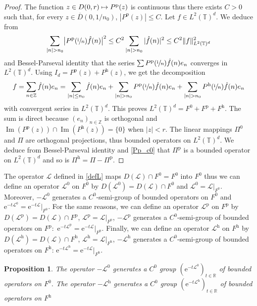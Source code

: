 \documentclass[10pt]{amsart}
\let\mathcal\mathscr
\def\mto{\mathchoice{\longmapsto}{\mapsto}{\mapsto}{\mapsto}}
\theoremstyle{plain}
\newtheorem{prop}[theorem]{Proposition}
\theoremstyle{definition}
\theoremstyle{remark}
\DeclareMathOperator{\Ima}{Im}
\newcommand{\set}{\mathbb}
\newcommand{\Z}{\set{Z}}
\newcommand{\R}{} %
\renewcommand{\R}{\set{R}}
\newcommand{\T}{\set{T}}
\newcommand{\h}{{\mathrm h}}
\newcommand{\p}{{\mathrm p}}
\newcommand{\eu}{\mathrm e}
\newcommand{\iu}{\mathrm i}
\let\originalleft\left
\let\originalright\right
\renewcommand{\left}{\mathopen{}\mathclose\bgroup\originalleft}
\renewcommand{\right}{\aftergroup\egroup\originalright}
\begin{document}
\begin{proof}
The function $z \in D(0,r) \mto P^\p(z)$ is continuous thus there exists $C>0$ such that, for every $z \in \overline{D}(0,1/n_0)$, $|P^\p(z)|\leq C$. Let $f \in L^2(\T)^d$. We deduce from
\begin{equation} \label{Pp_c0}
\sum_{|n| > n_0} \bigl| P^\p\left(\sfrac{\iu}{n}\right) \hat{f}(n) \bigr|^2 \leq C^2
\sum_{|n| > n_0} |\hat{f}(n)|^2 \leq C^2 \|f\|_{L^2(\T)^d}^2
\end{equation}
and Bessel-Parseval identity that the series $\sum P^\p\left(\sfrac{\iu}{n}\right) \hat{f}(n) e_n$ converges in $L^2(\T)^d$.
Using $I_d=P^\p(z)+P^\h(z)$, we get the decomposition
\[
f = \sum_{n\in\Z} \hat{f}(n) e_n =
\sum_{|n|\leq n_0} \hat{f}(n) e_n +
\sum_{|n| > n_0} P^\p\left(\sfrac{\iu}{n}\right) \hat{f}(n) e_n +
\sum_{|n| > n_0} P^\h\left(\sfrac{\iu}{n}\right) \hat{f}(n) e_n
\]
with convergent series in $L^2(\T)^d$.
This proves $L^2(\T)^{d} = F^0 + F^\p + F^\h$. The sum is direct because $(e_n)_{n\in\Z}$ is orthogonal and $\Ima(P^\p(z))\cap\Ima(P^\h(z))=\{0\}$ when $|z|<r$.
The linear mappings $\Pi^0$ and $\Pi$ are orthogonal projections, thus bounded operators on $L^2(\T)^d$. We deduce from Bessel-Parseval identity and \eqref{Pp_c0} that
$\Pi^\p$ is a bounded operator on $L^2(\T)^d$ and so is $\Pi^\h=\Pi-\Pi^\p$.
\end{proof}

The operator $\mathcal{L}$ defined in \eqref{defL} maps $D(\mathcal{L})\cap F^0 = F^0$ into $F^0$ thus we can define an operator $\mathcal{L}^0$ on $F^0$ by
$D(\mathcal{L}^0)=D(\mathcal{L})\cap F^0$ and $\mathcal{L}^0=\mathcal{L}|_{F^0}$. Moreover, $-\mathcal{L}^0$ generates a $C^0$-semi-group of bounded operators on $F^0$ and $\eu^{-t\mathcal{L}^0}=\eu^{-t\mathcal{L}}|_{F^0}$.
For the same reasons, we can define an operator $\mathcal{L}^\p$ on $F^\p$ by $D(\mathcal{L}^\p)=D(\mathcal{L})\cap F^\p$, $\mathcal{L}^\p=\mathcal{L}|_{F^\p}$, $-\mathcal{L}^\p$ generates a $C^0$-semi-group of bounded operators on \hbox{$F^\p$: $\eu^{-t\mathcal{L}^\p}=\eu^{-t\mathcal{L}}|_{F^\p}$}.
Finally, we can define an operator $\mathcal{L}^\h$ on $F^\h$ by $D(\mathcal{L}^\h)=D(\mathcal{L})\cap F^\h$, $\mathcal{L}^\h=\mathcal{L}|_{F^\h}$, $-\mathcal{L}^\h$ generates a $C^0$-semi-group of bounded operators on $F^\h$: $\eu^{-t\mathcal{L}^\h}=\eu^{-t\mathcal{L}}|_{F^\h}$.

\begin{prop}\label{ExtendSemigroups}
The operator $-\mathcal{L}^0$ generates a $C^0$ group $(\eu^{-t\mathcal{L}^0})_{t\in\R}$ of bounded operators on $F^0$.
The operator $-\mathcal{L}^\h$ generates a $C^0$ group $(\eu^{-t\mathcal{L}^\h})_{t\in\R}$ of bounded operators on $F^\h$
\end{prop}
\end{document}
